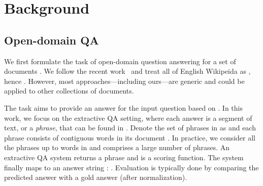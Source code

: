 \documentclass[11pt,a4paper]{article}
\newcommand\ti[1]{\textit{#1}}
\newcommand{\draftonly}[1]{#1}
\renewcommand{\draftonly}[1]{}
\newcommand{\draftcomment}[3]{\draftonly{\textcolor{#2}{{{[#1: #3]}}}}}
\newcommand{\danqi}[1]{\draftcomment{Danqi}{teal}{#1}}
\begin{document}








 

\section{Background}
\label{sec:background}







\begin{comment}
\danqi{
\begin{itemize}
\end{itemize}
}
\end{comment}

\subsection{Open-domain QA}

We first formulate the task of open-domain question answering for a set of  documents .
We follow the recent work~\cite{chen2017reading,lee2019latent} and treat all of English Wikipeida as , hence .
However, most approaches---including ours---are generic and could be applied to other collections of documents.

The task aims to provide an answer  for the input question  based on .
In this work, we focus on the extractive QA setting, where each answer is a segment of text, or a \ti{phrase}, that can be found in .
Denote the set of phrases in  as  and each phrase  consists of contiguous words  in its document .
In practice, we consider all the phrases up to  words in  and  comprises a large number of  phrases.
An extractive QA system returns a phrase  and  is a scoring function. The system finally maps  to an answer string : . Evaluation is typically done by comparing the predicted answer  with a gold answer  (after normalization).
\end{document}
